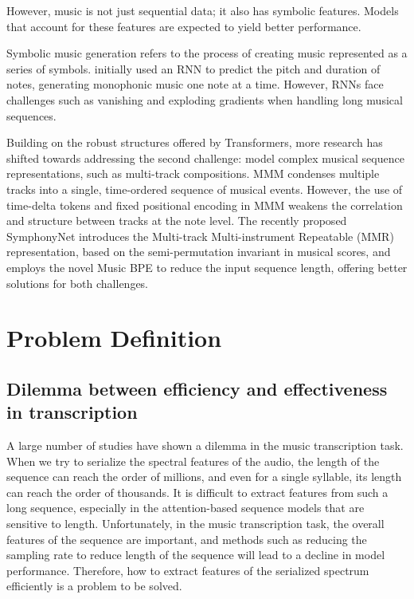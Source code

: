 \documentclass{article}
\begin{document}
However, music is not just sequential data; it also has symbolic features. Models that account for these features are expected to yield better performance.

Symbolic music generation refers to the process of creating music represented as a series of symbols. \citep{Todd} initially used an RNN to predict the pitch and duration of notes, generating monophonic music one note at a time. However, RNNs face challenges such as vanishing and exploding gradients when handling long musical sequences.

Building on the robust structures offered by Transformers, more research has shifted towards addressing the second challenge:  model complex musical sequence representations, such as multi-track compositions. MMM \citep{ens2020mmm} condenses multiple tracks into a single, time-ordered sequence of musical events. However, the use of time-delta tokens and fixed positional encoding in MMM weakens the correlation and structure between tracks at the note level. The recently proposed SymphonyNet\citep{liu2022symphony} introduces the Multi-track Multi-instrument Repeatable (MMR) representation, based on the semi-permutation invariant in musical scores, and employs the novel Music BPE to reduce the input sequence length, offering better solutions for both challenges.

\section{Problem Definition}

\subsection{Dilemma between efficiency and effectiveness in transcription} 

A large number of studies have shown a dilemma in the music transcription task. When we try to serialize the spectral features of the audio, the length of the sequence can reach the order of millions, and even for a single syllable, its length can reach the order of thousands. It is difficult to extract features from such a long sequence, especially in the attention-based sequence models that are sensitive to length. Unfortunately, in the music transcription task, the overall features of the sequence are important, and methods such as reducing the sampling rate to reduce length of the sequence will lead to a decline in model performance. Therefore, how to extract features of the serialized spectrum efficiently is a problem to be solved.
\end{document}
